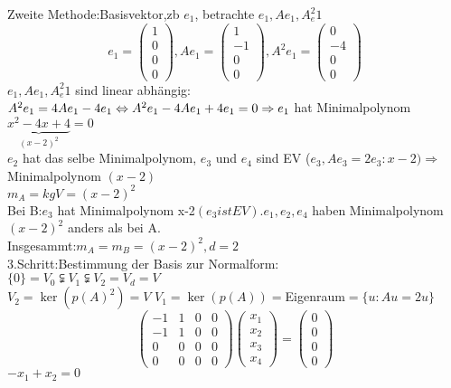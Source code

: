 \documentclass{mycourse}
\begin{document}
\begin{ex}
Zweite Methode:Basisvektor,zb $e_1$, betrachte $e_1,Ae_1,A^2_e1$\\
\[e_1=\begin{pmatrix}1\\0\\0\\0\end{pmatrix},Ae_1=\begin{pmatrix}1\\-1\\0\\0\end{pmatrix}, A^2e_1=\begin{pmatrix}0\\-4\\0\\0\end{pmatrix}\]
$e_1,Ae_1,A^2_e1$ sind linear abhängig:$A^2e_1=4Ae_1-4e_1\Leftrightarrow A^2e_1-4Ae_1+4e_1=0\\
\Rightarrow e_1$ hat Minimalpolynom $\underbrace{x^2-4x+4}_{(x-2)^2}=0$\\
$e_2$ hat das selbe Minimalpolynom, $e_3$ und $e_4$ sind EV ($e_3, Ae_3=2e_3 : x-2)\Rightarrow$ Minimalpolynom $(x-2)$\\
$m_A=kgV=(x-2)^2$
\\
Bei B:$e_3$ hat Minimalpolynom x-2$(e_3 ist EV). e_1,e_2,e_4$ haben Minimalpolynom $(x-2)^2$ anders als bei A.\\
Insgesammt:$m_A=m_B=(x-2)^2,d=2$\\
3.Schritt:Bestimmung der Basis zur Normalform:\\
$\{ 0\}=V_0\subsetneqq V_1\subsetneqq V_2=V_d=V$\\ $V_2=\ker(p(A)^2)=V$ $V_1=\ker(p(A))=$Eigenraum$=\{u:Au=2u\}$
\[\begin{pmatrix}-1&1&0&0\\-1&1&0&0\\0&0&0&0\\0&0&0&0\end{pmatrix} \begin{pmatrix}x_1\\x_2\\x_3\\x_4\end{pmatrix}=\begin{pmatrix}0\\0\\0\\0\end{pmatrix}
\]
$-x_1+x_2=0$\\

\end{ex}
\end{document}
